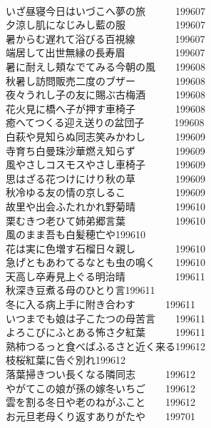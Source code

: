 \begin{multicols}{2}
\\いざ昼寝今日はいづこへ夢の旅　　　\hfill{199607}
\\夕涼し肌になじみし藍の服　　　　　\hfill{199607}
\\暑からむ遅れて浴びる百視線　　　　\hfill{199607}
\\端居して出世無縁の長寿眉　　　　　\hfill{199607}
\\暑に耐えし頬なでてみる今朝の風　　\hfill{199608}
\\秋暑し訪問販売二度のブザー　　　　\hfill{199608}
\\夜々うれし子の友に賜ぶ古梅酒　　　\hfill{199608}
\\花火見に橋へ子が押す車椅子　　　　\hfill{199608}
\\癒へてつくる迎え送りの盆団子　　　\hfill{199608}
\\白萩や見知らぬ同志笑みかわし　　　\hfill{199609}
\\寺育ち白曼珠沙華燃え知らず　　　　\hfill{199609}
\\風やさしコスモスやさし車椅子　　　\hfill{199609}
\\思はざる花つけにけり秋の草　　　　\hfill{199609}
\\秋冷ゆる友の情の京しるこ　　　　　\hfill{199609}
\\故里や出会ふたれかれ野菊晴　　　　\hfill{199610}
\\栗むきつ老ひて姉弟郷言葉　　　　　\hfill{199610}
\\風のまま吾も白髪穂亡や\hfill{199610}
\\花は実に色増す石榴日々親し　　　　\hfill{199610}
\\急げともあわてるなとも虫の鳴く　　\hfill{199610}
\\天高し卒寿見上ぐる明治晴　　　　　\hfill{199611}
\\秋深き豆煮る母のひとり言\hfill{199611}
\\冬に入る病上手に附き合わす　　　\hfill{199611}
\\いつまでも娘は子こたつの母苦言　　\hfill{199611}
\\よろこびにふとある怖さ夕紅葉　　　\hfill{199611}
\\熟柿つるっと食べばふるさと近く来る\hfill{199612}
\\枝桜紅葉に告ぐ別れ\hfill{199612}
\\落葉掃きつい長くなる隣同志　　　\hfill{199612}
\\やがてこの娘が孫の嫁冬いちご　　\hfill{199612}
\\雲を割る冬日や老のねがふこと　　\hfill{199612}
\\お元旦老母くり返すありがたや　　\hfill{199701}

\end{multicols}

